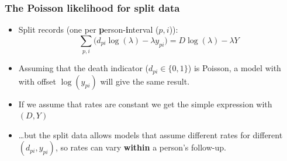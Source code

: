 
\begin{frame}[fragile]
  \frametitle{The Poisson likelihood for split data}
\begin{itemize}[<+->]
\item Split records (one per \textbf{p}erson-\textbf{i}nterval
  ($p,i$)):
\[
 \sum_{p,i} \bigl( d_{pi}\log(\lambda) - \lambda y_{pi} \bigr)
 = D\log(\lambda) - \lambda Y
\]
\item Assuming that the death indicator ($d_{pi} \in \{0,1\}$) is Poisson,
  a model with with offset $\log(y_{pi})$ will give the same result.
\item If we assume that rates are constant we get the simple
  expression with $(D,Y)$
\item \ldots but the split data allows models that assume different
  rates for different $(d_{pi},y_{pi})$, so rates can vary
  \textbf{within} a person's follow-up.
\end{itemize}
\end{frame}


